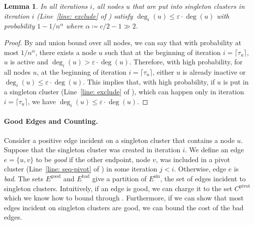 \documentclass[10pt,a4paper]{article}
\newtheorem{lemma}{Lemma}[section]
\newcommand{\eps}{\ensuremath{\varepsilon}}
\newcommand{\ourcluster}{\ensuremath{C^{\textrm{pivot}}}\xspace}
\newcommand{\badedges}{\ensuremath{E^{\textrm{bad}}}\xspace}
\newcommand{\goodedges}{\ensuremath{E^{\textrm{good}}}\xspace}
\newcommand{\singletonedges}{\ensuremath{E^{\textrm{sin}}}\xspace}
\begin{document}
\begin{lemma} \label{lemma: singleton-cluster-deg-bound}
    In all iterations $i$, all nodes $u$ that are put into singleton clusters in iteration $i$ (Line~\ref{line: exclude} of ) satisfy $\deg_{i}(u) \le \eps \cdot \deg(u)$ with probability $1-1/n^{\alpha}$ where $\alpha \coloneqq c/2 - 1 \gg 2$.
\end{lemma}
\begin{proof}
By  and union bound over all nodes, we can say that with probability at most $1/n^\alpha$, there exists a node $u$ such that at the beginning of iteration $i = \lceil\tau_u\rceil$, $u$ is active and $\deg_{i}(u) > \eps \cdot \deg(u)$. Therefore, with high probability, for all nodes $u$, at the beginning of iteration $i = \lceil\tau_u\rceil$, either $u$ is already inactive or $\deg_{i}(u) \le \eps \cdot \deg(u)$. This implies that, with high probability, if $u$ is put in a singleton cluster (Line~\ref{line: exclude} of ), which can happen only in iteration $i = \lceil\tau_u\rceil$, we have $\deg_{i}(u) \le \eps \cdot \deg(u)$.
\end{proof}


\paragraph*{Good Edges and Counting.}
Consider a positive edge incident on a singleton cluster that contains a node $u$.
Suppose that the singleton cluster was created in iteration $i$.
We define an edge $e = \{u, v \}$ to be \emph{good} if the other endpoint, node $v$, was included in a pivot cluster (Line~\ref{line: seq-pivot} of ) in some iteration $j < i$.
Otherwise, edge $e$ is \emph{bad}. 
The sets $\goodedges$ and $\badedges$ give a partition of $\singletonedges$, the set of edges incident to singleton clusters. 
Intuitively, if an edge is good, we can charge it to the set $\ourcluster$ which we know how to bound through .
Furthermore, if we can show that most edges incident on singleton clusters are good, we can bound the cost of the bad edges.
\end{document}

